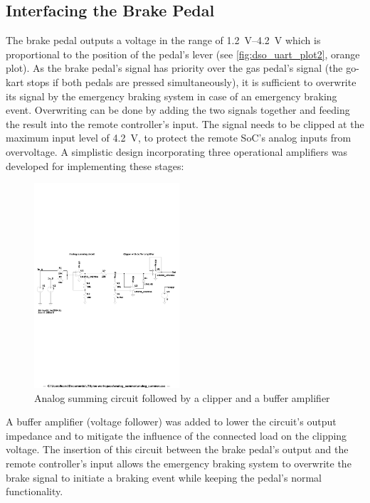 \subsection{Interfacing the Brake Pedal}
The brake pedal outputs a voltage in the range of \SIrange{1.2}{4.2}{\volt} which is proportional to the position of the pedal's lever (see \ref{fig:dso_uart_plot2}, orange plot).
As the brake pedal's signal has priority over the gas pedal's signal (the go-kart stops if both pedals are pressed simultaneously), it is sufficient to overwrite its signal by the emergency braking system in case of an emergency braking event.
Overwriting can be done by adding the two signals together and feeding the result into the remote controller's input.
The signal needs to be clipped at the maximum input level of \SI{4.2}{\volt}, to protect the remote SoC's analog inputs from overvoltage.
A simplistic design incorporating three operational amplifiers was developed for implementing these stages:
\begin{figure}[!htbp]
\centering
  \includegraphics[trim=0cm 11cm 0cm 10cm, clip, width=0.48\textwidth]{images/analog_summer.pdf}
\caption{Analog summing circuit followed by a clipper and a buffer amplifier}
\label{fig:analog_summer}
\end{figure}
\FloatBarrier\noindent
A buffer amplifier (voltage follower) was added to lower the circuit's output impedance and to mitigate the influence of the connected load on the clipping voltage.
The insertion of this circuit between the brake pedal's output and the remote controller's input allows the emergency braking system to overwrite the brake signal to initiate a braking event while keeping the pedal's normal functionality.